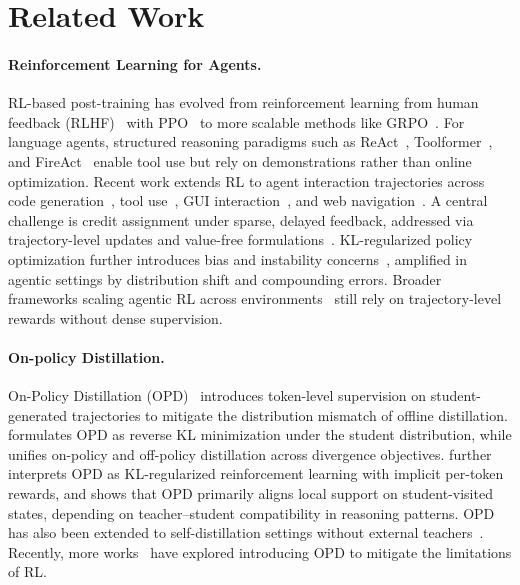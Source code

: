 \section{Related Work}\label{sec:related}



\paragraph{Reinforcement Learning for Agents.}
RL-based post-training has evolved from reinforcement learning from human feedback (RLHF)~\citep{christiano2017deep,ziegler2019fine} with PPO~\citep{schulman2017proximal} to more scalable methods like GRPO~\citep{grpo}. For language agents, structured reasoning paradigms such as ReAct~\citep{react}, Toolformer~\citep{schick2023toolformer}, and FireAct~\citep{chen2023fireact} enable tool use but rely on demonstrations rather than online optimization. Recent work extends RL to agent interaction trajectories across code generation~\citep{yang2024swe}, tool use~\citep{feng2025retool}, GUI interaction~\citep{bai2024digirl}, and web navigation~\citep{qi2024webrl}. A central challenge is credit assignment under sparse, delayed feedback, addressed via trajectory-level updates and value-free formulations~\citep{zhou2024archer, chen2025reinforcement}. KL-regularized policy optimization further introduces bias and instability concerns~\citep{schulman2017proximal}, amplified in agentic settings by distribution shift and compounding errors. Broader frameworks scaling agentic RL across environments~\citep{demy, wang2026rlanything, wang2025co} still rely on trajectory-level rewards without dense supervision.








\paragraph{On-policy Distillation.}
On-Policy Distillation (OPD)~\citep{opdsurvey,opcd,gad,hybridOPD, scope,tip,chen2026soda} introduces token-level supervision on student-generated trajectories to mitigate the distribution mismatch of offline distillation. \citet{gu2024minillm} formulates OPD as reverse KL minimization under the student distribution, while \citet{opd} unifies on-policy and off-policy distillation across divergence objectives. \citet{yang2026learning} further interprets OPD as KL-regularized reinforcement learning with implicit per-token rewards, and \citet{li2026rethinking} shows that OPD primarily aligns local support on student-visited states, depending on teacher–student compatibility in reasoning patterns. OPD has also been extended to self-distillation settings without external teachers~\citep{opsd,opsd2,sdpo,sdft,dqchen}.
Recently, more works~\citep{srpo,sdrlvr,bousselham2025vold,wang2026openclaw,skillsd} have explored introducing OPD to mitigate the limitations of RL.
